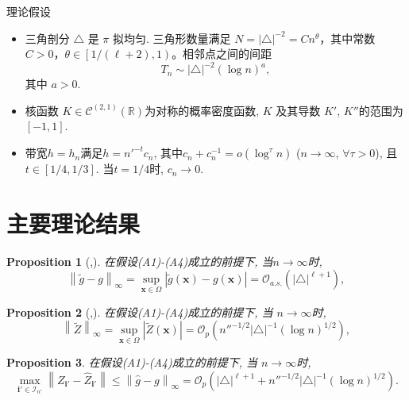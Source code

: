 \documentclass{beamer}
\newtheorem{proposition}{Proposition}
\begin{document}
\begin{frame}{理论假设}
\begin{itemize}
\item[(A4)] 三角剖分 $\triangle$ 是 $\pi$ 拟均匀. 三角形数量满足 \( N = |\triangle|^{-2} = C n^\theta\)，其中常数 \( C > 0 \)，\( \theta \in \left[ 1/(\ell+2), 1 \right) \)。相邻点之间的间距 \[
T_n \sim |\triangle|^{-2} (\log n)^{a},
\]
其中 \( a > 0 \).
\label{Assumption:Delta}

\item[(A5)] 核函数 $K  \in\mathcal{C}^{(2,1)}(\mathbb{R})$为对称的概率密度函数, $K$ 及其导数 $K'$, $K''$的范围为$[-1,1].$ 

\item[(A6)]  带宽$h=h_n$满足$h=n'^{-t}c_n$, 其中$c_n+c_n^{-1}=o(\log ^{\tau} n)$ ($n \to \infty$, $\forall \tau > 0$), 且$t \in [1/4,1/3]$.
当$t=1/4$时, $c_n \to 0$.
\end{itemize}
\end{frame}

\section{主要理论结果}
\begin{frame}
\begin{proposition}[\cite{Yao2003ExponentialIF},\cite{bosq2012nonparametric}]
    在假设(A1)-(A4)成立的前提下, 当$n\to\infty$时,
    \[
\left\lVert \tilde{g} - g \right\rVert_{\infty} = \sup_{\boldsymbol{x} \in \Omega} \left| \tilde{g}(\boldsymbol{x}) - g(\boldsymbol{x}) \right| = \mathcal{O}_{a.s.} \left( |\triangle|^{\ell+1} \right),
\]
\end{proposition}

\begin{proposition}
[\cite{lai2007spline},\cite{yu2019estimation}]
  在假设(A1)-(A4)成立的前提下, 当 $n\to\infty$时,
  \[
\left\lVert \tilde{Z} \right\rVert_{\infty} = \sup_{\boldsymbol{x} \in \Omega} \left| \tilde{Z}(\boldsymbol{x}) \right| = \mathcal{O}_p \left( n''^{-1/2} |\triangle|^{-1} (\log n)^{1/2} \right),
\]  
\end{proposition}

\begin{proposition}
    在假设(A1)-(A4)成立的前提下, 当 $n\to\infty$时,
   \[
\max_{\mathbf{i}' \in \mathcal{I}_{n'}} \left\lVert Z_{\mathbf{i}'} - \hat{Z}_{\mathbf{i}'} \right\rVert 
\le \left\lVert \hat{g} - g \right\rVert_{\infty}
= \mathcal{O}_p \left( |\triangle|^{\ell+1} + n''^{-1/2} |\triangle|^{-1} (\log n)^{1/2} \right).
\]
\end{proposition}
\end{frame}
\end{document}
